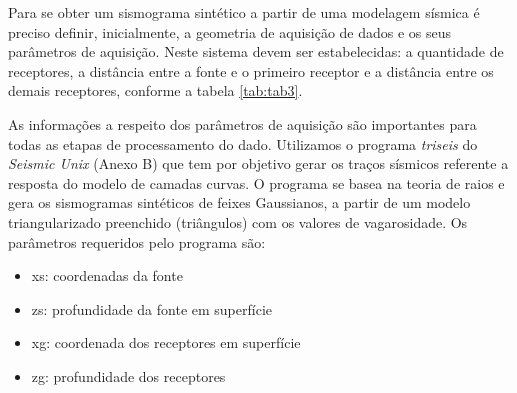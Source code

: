 Para se obter um sismograma sintético a partir de uma modelagem sísmica é preciso definir, inicialmente, a geometria de aquisição de dados e os seus parâmetros de aquisição. Neste sistema devem ser estabelecidas: a quantidade de receptores, a distância entre a fonte e o primeiro receptor e a distância entre os demais receptores, conforme a tabela \ref{tab:tab3}.


As informações a respeito dos parâmetros de aquisição são importantes para todas as etapas de processamento do dado. Utilizamos o programa \textit{triseis} do \textit{Seismic Unix} (Anexo B) que tem por objetivo gerar os traços sísmicos referente a resposta do modelo de camadas curvas. O programa se basea na teoria de raios e gera os sismogramas sintéticos de feixes Gaussianos, a partir de um modelo triangularizado preenchido (triângulos) com os valores de vagarosidade. Os parâmetros requeridos pelo programa são:

\begin{itemize}
 \item xs: coordenadas da fonte
 \item zs: profundidade da fonte em superfície
 \item xg: coordenada dos receptores em superfície
 \item zg: profundidade dos receptores
\end{itemize}

